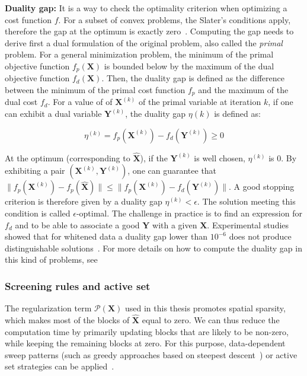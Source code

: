 \textbf{Duality gap:} It is a way to check the optimality criterion when optimizing a cost function $f$. For a subset of convex problems, the Slater's conditions apply, therefore the gap at the optimum is exactly zero~\cite{Boyd_Vandenberghe04}. Computing the gap needs to derive first a dual formulation of the original problem, also called the \textit{primal} problem. For a general minimization problem, the minimum of the primal objective function $f_p(\mathbf{X})$ is bounded below by the maximum of the dual objective function $f_d(\mathbf{X})$. Then, the duality gap is defined as the difference between the minimum of the primal cost function $f_p$ and the maximum of the dual cost $f_d$. For a value of of $\mathbf{X}^{(k)}$ of the primal variable at iteration $k$, if one can exhibit a dual variable $\mathbf{Y}^{(k)}$, the duality gap $\eta{(k)}$ is defined as:

\begin{equation}
\eta^{(k)}=f_p(\mathbf{X}^{(k)})-f_d(\mathbf{Y}^{(k)}) \geq 0
\end{equation}

At the optimum (corresponding to $\hat{\mathbf{X}}$), if the $\mathbf{Y}^{(k)}$ is well chosen, $\eta^{(k)}$ is $0$. By exhibiting a pair $(\mathbf{X}^{(k)}, \mathbf{Y}^{(k)})$, one can guarantee that $\|f_p(\mathbf{X}^{(k)}) - f_p(\hat{\mathbf{X}})\| \leq \|f_p(\mathbf{X}^{(k)})-f_d(\mathbf{Y}^{(k)})\|$. A good stopping criterion is therefore given by a duality gap $\eta^{(k)}<\epsilon$. The solution meeting this condition is called $\epsilon$-optimal. The challenge in practice is to find an expression for $f_d$ and to be able to associate a good $\mathbf{Y}$ with a given $\mathbf{X}$. Experimental studies showed that for whitened data a duality gap lower than $10^{-6}$ does not produce distinguishable solutions~\cite{Gramfort_Kowalski_Hamalainen12}. For more details on how to compute the duality gap in this kind of problems, see~\cite{bach2012optimization,Gramfort_Kowalski_Hamalainen12,strohmeier-etal:16}\\


\subsubsection*{Screening rules and active set} \label{section:active_set}
The regularization term $\mathcal{P}(\mathbf{X})$ used in this thesis promotes spatial sparsity, which makes most of the blocks of $\hat{\mathbf{X}}$ equal to zero. We can thus reduce the computation time by primarily updating blocks that are likely to be non-zero, while keeping the remaining blocks at zero. For this purpose, data-dependent sweep patterns (such as greedy approaches based on steepest descent~\cite{li-osher:2009,wei2012doa}) or active set strategies can be applied~\cite{friedman-etal:2010,roth-etal:08}.\\

